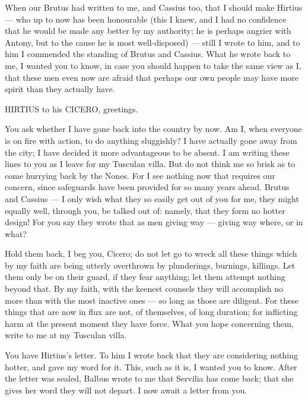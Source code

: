 

 When our Brutus had written to me, and Cassius too, that I should make Hirtius --- who up to now has been honourable (this I knew, and I had no confidence that he would be made any better by my authority; he is perhaps angrier with Antony, but to the cause he is most well-disposed) --- still I wrote to him, and to him I commended the standing of Brutus and Cassius. What he wrote back to me, I wanted you to know, in case you should happen to take the same view as I, that these men even now are afraid that perhaps our own people may have more spirit than they actually have.

 HIRTIUS to his CICERO, greetings.

You ask whether I have gone back into the country by now. Am I, when everyone is on fire with action, to do anything sluggishly? I have actually gone away from the city; I have decided it more advantageous to be absent. I am writing these lines to you as I leave for my Tusculan villa. But do not think me so brisk as to come hurrying back by the Nones. For I see nothing now that requires our concern, since safeguards have been provided for so many years ahead. Brutus and Cassius --- I only wish what they so easily get out of you for me, they might equally well, through you, be talked out of: namely, that they form no hotter design! For you say they wrote that as men giving way --- giving way where, or in what?

 Hold them back, I beg you, Cicero; do not let go to wreck all these things which by my faith are being utterly overthrown by plunderings, burnings, killings. Let them only be on their guard, if they fear anything; let them attempt nothing beyond that. By my faith, with the keenest counsels they will accomplish no more than with the most inactive ones --- so long as those are diligent. For these things that are now in flux are not, of themselves, of long duration; for inflicting harm at the present moment they have force. What you hope concerning them, write to me at my Tusculan villa.

 You have Hirtius's letter. To him I wrote back that they are considering nothing hotter, and gave my word for it. This, such as it is, I wanted you to know. After the letter was sealed, Balbus wrote to me that Servilia has come back; that she gives her word they will not depart. I now await a letter from you.

